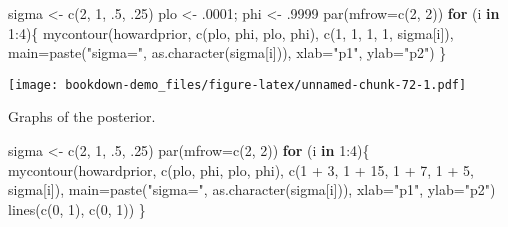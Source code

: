 \documentclass[
]{book}
\newenvironment{Shaded}{\begin{snugshade}}{\end{snugshade}}
\newcommand{\AttributeTok}[1]{\textcolor[rgb]{0.77,0.63,0.00}{#1}}
\newcommand{\ControlFlowTok}[1]{\textcolor[rgb]{0.13,0.29,0.53}{\textbf{#1}}}
\newcommand{\DecValTok}[1]{\textcolor[rgb]{0.00,0.00,0.81}{#1}}
\newcommand{\FunctionTok}[1]{\textcolor[rgb]{0.00,0.00,0.00}{#1}}
\newcommand{\NormalTok}[1]{#1}
\newcommand{\OtherTok}[1]{\textcolor[rgb]{0.56,0.35,0.01}{#1}}
\newcommand{\SpecialCharTok}[1]{\textcolor[rgb]{0.00,0.00,0.00}{#1}}
\newcommand{\StringTok}[1]{\textcolor[rgb]{0.31,0.60,0.02}{#1}}
\begin{document}
\begin{Shaded}
\begin{Highlighting}[]
\NormalTok{sigma }\OtherTok{\textless{}{-}} \FunctionTok{c}\NormalTok{(}\DecValTok{2}\NormalTok{, }\DecValTok{1}\NormalTok{, .}\DecValTok{5}\NormalTok{, .}\DecValTok{25}\NormalTok{)}
\NormalTok{plo }\OtherTok{\textless{}{-}}\NormalTok{ .}\DecValTok{0001}\NormalTok{; phi }\OtherTok{\textless{}{-}}\NormalTok{ .}\DecValTok{9999}
\FunctionTok{par}\NormalTok{(}\AttributeTok{mfrow=}\FunctionTok{c}\NormalTok{(}\DecValTok{2}\NormalTok{, }\DecValTok{2}\NormalTok{))}
\ControlFlowTok{for}\NormalTok{ (i }\ControlFlowTok{in} \DecValTok{1}\SpecialCharTok{:}\DecValTok{4}\NormalTok{)\{}
    \FunctionTok{mycontour}\NormalTok{(howardprior, }
              \FunctionTok{c}\NormalTok{(plo, phi, plo, phi),}
              \FunctionTok{c}\NormalTok{(}\DecValTok{1}\NormalTok{, }\DecValTok{1}\NormalTok{, }\DecValTok{1}\NormalTok{, }\DecValTok{1}\NormalTok{, sigma[i]),}
      \AttributeTok{main=}\FunctionTok{paste}\NormalTok{(}\StringTok{"sigma="}\NormalTok{, }\FunctionTok{as.character}\NormalTok{(sigma[i])),}
      \AttributeTok{xlab=}\StringTok{"p1"}\NormalTok{, }\AttributeTok{ylab=}\StringTok{"p2"}\NormalTok{)}
\NormalTok{\}}
\end{Highlighting}
\end{Shaded}

\texttt{[image: bookdown-demo\_files/figure-latex/unnamed-chunk-72-1.pdf]}

Graphs of the posterior.

\begin{Shaded}
\begin{Highlighting}[]
\NormalTok{sigma }\OtherTok{\textless{}{-}} \FunctionTok{c}\NormalTok{(}\DecValTok{2}\NormalTok{, }\DecValTok{1}\NormalTok{, .}\DecValTok{5}\NormalTok{, .}\DecValTok{25}\NormalTok{)}
\FunctionTok{par}\NormalTok{(}\AttributeTok{mfrow=}\FunctionTok{c}\NormalTok{(}\DecValTok{2}\NormalTok{, }\DecValTok{2}\NormalTok{))}
\ControlFlowTok{for}\NormalTok{ (i }\ControlFlowTok{in} \DecValTok{1}\SpecialCharTok{:}\DecValTok{4}\NormalTok{)\{}
   \FunctionTok{mycontour}\NormalTok{(howardprior,}
             \FunctionTok{c}\NormalTok{(plo, phi, plo, phi),}
     \FunctionTok{c}\NormalTok{(}\DecValTok{1} \SpecialCharTok{+} \DecValTok{3}\NormalTok{, }\DecValTok{1} \SpecialCharTok{+} \DecValTok{15}\NormalTok{, }\DecValTok{1} \SpecialCharTok{+} \DecValTok{7}\NormalTok{, }\DecValTok{1} \SpecialCharTok{+} \DecValTok{5}\NormalTok{, sigma[i]),}
     \AttributeTok{main=}\FunctionTok{paste}\NormalTok{(}\StringTok{"sigma="}\NormalTok{, }\FunctionTok{as.character}\NormalTok{(sigma[i])),}
     \AttributeTok{xlab=}\StringTok{"p1"}\NormalTok{, }\AttributeTok{ylab=}\StringTok{"p2"}\NormalTok{)}
   \FunctionTok{lines}\NormalTok{(}\FunctionTok{c}\NormalTok{(}\DecValTok{0}\NormalTok{, }\DecValTok{1}\NormalTok{), }\FunctionTok{c}\NormalTok{(}\DecValTok{0}\NormalTok{, }\DecValTok{1}\NormalTok{))}
\NormalTok{ \}}
\end{Highlighting}
\end{Shaded}
\end{document}
